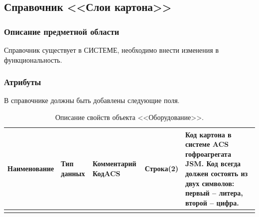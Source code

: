 \subsection{Справочник <<Слои картона>>}
\label{spr:Layer}

\subsubsection{Описание предметной области}

Справочник существует в СИСТЕМЕ, необходимо внести изменения в функциональность.

\subsubsection{Атрибуты}

В справочнике должны быть добавлены следующие поля.

\pc
\begin{longtable}{|p{50mm}|p{30mm}|p{78mm}|}
\hline
{\bf Наименование} & {\bf Тип данных} &  {\bf Комментарий} \endhead
\hline 
   КодACS & Строка(2) & Код картона в системе ACS гофроагрегата JSM. Код всегда должен состоять из двух символов: первый – литера, второй – цифра. \\
   \hline
\caption{Описание свойств объекта <<Оборудование>>.}
\label{tab:tdb_eqpt}
\end{longtable} 
